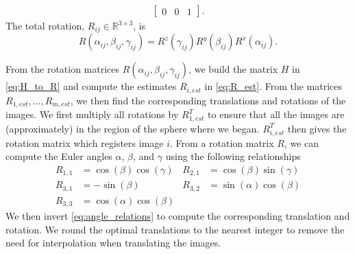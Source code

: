 \documentclass{pnastwo}
\begin{document}
\begin{article}
\begin{materials}
\begin{equation}
\begin{aligned}
\begin{bmatrix}
    0 & 0 & 1 
    \end{bmatrix}.
\end{aligned}
\end{equation}
%
The total rotation, $R_{ij} \in \mathbb{R}^{3 \times 3}$, is 
\begin{equation} \label{eq:total_rot}
	R(\alpha_{ij}, \beta_{ij}, \gamma_{ij})	 = R^z(\gamma_{ij})  R^y(\beta_{ij})  R^x(\alpha_{ij}).
\end{equation}
%

From the rotation matrices $R(\alpha_{ij}, \beta_{ij}, \gamma_{ij})$,
we build the matrix $H$ in \eqref{eq:H_to_R} and compute the estimates $R_{i, est}$ in \eqref{eq:R_est}.
%
From the matrices $R_{1, est}, \dots, R_{m, est}$, we then find the corresponding translations and rotations of the images.
%
We first multiply all rotations by $R_{1, est}^T$ to ensure that all the images are (approximately) in the region of the sphere where we began.
%
$R_{i,est}^T$ then gives the rotation matrix which registers image $i$. 
%
From a rotation matrix $R$, we can compute the Euler angles $\alpha$, $\beta$, and $\gamma$ using the following relationships
\begin{equation}
\begin{aligned}
R_{1,1} & = \cos(\beta)\cos(\gamma) &
R_{2,1} & = \cos(\beta)\sin(\gamma) \\
R_{3,1} & = -\sin(\beta) &
R_{3,2} & = \sin(\alpha)\cos(\beta) \\
R_{3,3} & = \cos(\alpha)\cos(\beta)  &
\end{aligned}
\end{equation}
%
We then invert \eqref{eq:angle_relations} to compute the corresponding translation and rotation.
%
We round the optimal translations to the nearest integer to remove the need for interpolation when translating the images.  


\end{materials}
\end{article}
\end{document}
